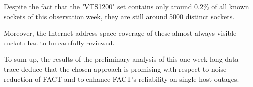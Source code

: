 \documentclass{sigcomm-alternate}
\begin{document}
Despite the fact that the "VTS1200" set contains only around $0.2\%$
of all known sockets of this observation week, they are still around
5000 distinct sockets.

Moreover, the Internet address space coverage of these almost always
visible sockets has to be carefully reviewed.

To sum up, the results of the preliminary analysis of this one week
long data trace deduce that the chosen approach is promising with
respect to noise reduction of FACT and to enhance FACT's reliability
on single host outages.


 
\end{document}
